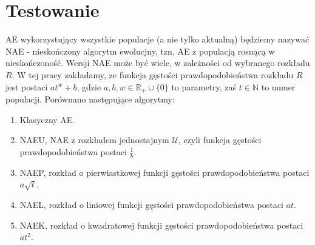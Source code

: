 \documentclass[12pt, a4paper]{article}
\begin{document}
\section{Testowanie}

AE wykorzystujący wszystkie populacje (a nie tylko aktualną) będziemy nazywać NAE - nieskończony algorytm ewolucjny, 
tzn. AE z populacją rosnącą w nieskończoność.
Wersji NAE może być wiele, w zależności od wybranego rozkładu $R$. 
W tej pracy zakładamy, ze funkcja gęstości prawdopodobieństwa rozkładu $R$ jest postaci $at^w + b$, gdzie
$a, b, w \in \mathbb{R_+} \cup \{0\}$ to parametry, zaś $t \in \mathbb{N}$ to numer populacji. 
Porównano następujące algorytmy:

\begin{enumerate}
 \item Klasyczny AE.
 \item NAEU, NAE z rozkładem jednostajnym $\mathcal{U}$, czyli funkcja gęstości prawdopodobieństwa postaci $\frac{1}{b}$. 
 \item NAEP, rozkład o pierwiastkowej funkcji gęstości prawdopodobieństwa postaci $a\sqrt{t}$.
 \item NAEL, rozkład o liniowej funkcji gęstości prawdopodobieństwa postaci $at$.
 \item NAEK, rozkład o kwadratowej funkcji gęstości prawdopodobieństwa postaci $at^2$.
\end{enumerate}
\end{document}
